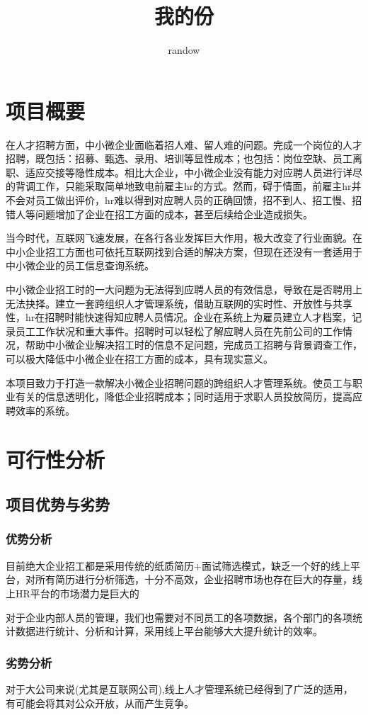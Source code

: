 \documentclass[master]{hduthesis}
\title{我的份}
\author{randow}
\begin{document}
\maketitle
\newpage
\tableofcontents
\newpage
\section{项目概要}
在人才招聘方面，中小微企业面临着招人难、留人难的问题。完成一个岗位的人才招聘，既包括：招募、甄选、录用、培训等显性成本；也包括：岗位空缺、员工离职、适应交接等隐性成本。相比大企业，中小微企业没有能力对应聘人员进行详尽的背调工作，只能采取简单地致电前雇主hr的方式。然而，碍于情面，前雇主hr并不会对员工做出评价，hr难以得到对应聘人员的正确回馈，招不到人、招工慢、招错人等问题增加了企业在招工方面的成本，甚至后续给企业造成损失。

当今时代，互联网飞速发展，在各行各业发挥巨大作用，极大改变了行业面貌。在中小企业招工方面也可依托互联网找到合适的解决方案，但现在还没有一套适用于中小微企业的员工信息查询系统。

中小微企业招工时的一大问题为无法得到应聘人员的有效信息，导致在是否聘用上无法抉择。建立一套跨组织人才管理系统，借助互联网的实时性、开放性与共享性，hr在招聘时能快速得知应聘人员情况。企业在系统上为雇员建立人才档案，记录员工工作状况和重大事件。招聘时可以轻松了解应聘人员在先前公司的工作情况，帮助中小微企业解决招工时的信息不足问题，完成员工招聘与背景调查工作，可以极大降低中小微企业在招工方面的成本，具有现实意义。

本项目致力于打造一款解决小微企业招聘问题的跨组织人才管理系统。使员工与职业有关的信息透明化，降低企业招聘成本；同时适用于求职人员投放简历，提高应聘效率的系统。
\section{可行性分析}
\subsection{项目优势与劣势}
\subsubsection{优势分析}
目前绝大企业招工都是采用传统的纸质简历+面试筛选模式，缺乏一个好的线上平台，对所有简历进行分析筛选，十分不高效，企业招聘市场也存在巨大的存量，线上HR平台的市场潜力是巨大的

对于企业内部人员的管理，我们也需要对不同员工的各项数据，各个部门的各项统计数据进行统计、分析和计算，采用线上平台能够大大提升统计的效率。
\subsubsection{劣势分析}
对于大公司来说(尤其是互联网公司),线上人才管理系统已经得到了广泛的适用，有可能会将其对公众开放，从而产生竞争。
\end{document}
